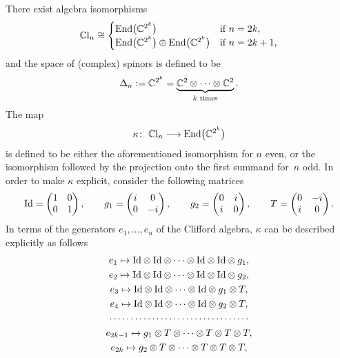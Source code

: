 \documentclass[pdftex]{sigma}
\newcommand{\End}{{\rm End}}
\numberwithin{equation}{section}
\begin{document}
There exist algebra isomorphisms
\begin{gather}
\mathbb{C}{\rm l}_n\cong
 \begin{cases}
 \End\big(\mathbb{C}^{2^k}\big) & \text{if $n=2k$},\\
 \End\big(\mathbb{C}^{2^k}\big)\oplus\End\big(\mathbb{C}^{2^k}\big) & \text{if $n=2k+1$},
 \end{cases}\label{eq: isomorphisms Clifford algebras}
\end{gather}
and the space of (complex) spinors is def\/ined to be
\begin{gather*}\Delta_n:=\mathbb{C}^{2^k}=\underbrace{\mathbb{C}^2\otimes \dots \otimes \mathbb{C}^2}_{k\,\,{\rm times}}.\end{gather*}
The map
\begin{gather*}\kappa\colon \ \mathbb{C}{\rm l}_n \longrightarrow \End\big(\mathbb{C}^{2^k}\big)\end{gather*}
is def\/ined to be either the aforementioned isomorphism for $n$ even, or the isomorphism followed by the projection onto the f\/irst summand for~$n$ odd. In order to make $\kappa$ explicit, consider the following matrices
\begin{gather*}{\rm Id} = \left(\begin{matrix}
1 & 0\\
0 & 1
 \end{matrix}\right),\qquad
g_1 = \left(\begin{matrix}
i & 0\\
0 & -i
 \end{matrix}\right),\qquad
g_2 = \left(\begin{matrix}
0 & i\\
i & 0
 \end{matrix}\right),\qquad
T = \left(\begin{matrix}
0 & -i\\
i & 0
 \end{matrix}\right).
\end{gather*}
In terms of the generators $e_1, \dots, e_n$ of the Clif\/ford algebra, $\kappa$ can be described explicitly as follows
\begin{gather}
e_1 \mapsto {\rm Id}\otimes {\rm Id}\otimes \dots\otimes {\rm Id}\otimes {\rm Id}\otimes g_1,\nonumber\\
e_2 \mapsto {\rm Id}\otimes {\rm Id}\otimes \dots\otimes {\rm Id}\otimes {\rm Id}\otimes g_2,\nonumber\\
e_3 \mapsto {\rm Id}\otimes {\rm Id}\otimes \dots\otimes {\rm Id}\otimes g_1\otimes T,\nonumber\\
e_4 \mapsto {\rm Id}\otimes {\rm Id}\otimes \dots\otimes {\rm Id}\otimes g_2\otimes T,\label{eq: explicit isomorphisms Clifford algebras}\\
 \cdots\cdots\cdots\cdots\cdots\cdots\cdots\cdots\cdots\cdots\cdots\nonumber\\
e_{2k-1} \mapsto g_1\otimes T\otimes \dots\otimes T\otimes T\otimes T,\nonumber\\
e_{2k} \mapsto g_2\otimes T\otimes\dots\otimes T\otimes T\otimes T,\nonumber
\end{gather}
\end{document}
